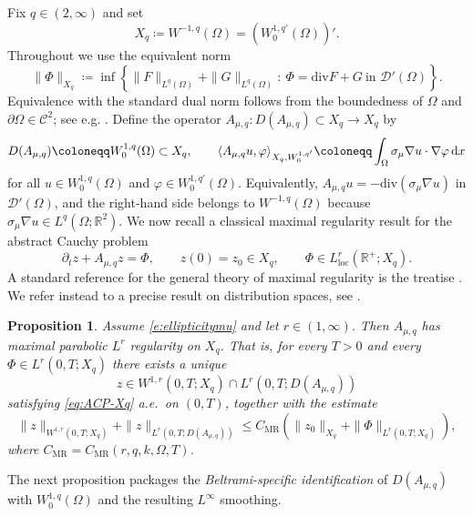 \documentclass[12pt,leqno]{amsart}
\def\d{{\rm d}}
\def\pt {{\partial_t}}
\newtheorem{proposition}[theorem]{Proposition}
\theoremstyle{definition}
\numberwithin{equation}{section}
\numberwithin{figure}{section}
\begin{document}
Fix $q\in(2,\infty)$ and set \[X_q\coloneqq W^{-1,q}(\Omega)=(W^{1,q'}_0(\Omega))'.\]
Throughout we use the equivalent norm
\begin{equation}\label{eq:Xq-norm}
\|\Phi\|_{X_q}\coloneqq
\inf\left\{\|F\|_{L^q(\Omega)}+\|G\|_{L^q(\Omega)}:\ \Phi={\mathrm{div}} F+G\ \text{in }\mathcal D'(\Omega)\right\}.
\end{equation}
Equivalence with the standard dual norm follows from the boundedness of $\Omega$ and
$\partial\Omega\in \mathcal C^2$; see e.g. \cite[Theorem~III.2.43]{Boyer-Fabrie-Book}.
Define the operator
$
A_{\mu,q}:D(A_{\mu,q})\subset X_q\to X_q
$
by
\begin{equation}\label{eq:def-Amuq}
D(A_{\mu,q})\coloneqq W^{1,q}_0(\Omega)\subset X_q,
\qquad
\langle A_{\mu,q}u,\varphi\rangle_{X_q,W^{1,q'}_0}
\coloneqq \int_\Omega \sigma_\mu \nabla u\cdot \nabla\varphi\,\d x
\end{equation}
for all $u\in W^{1,q}_0(\Omega)$ and $\varphi\in W^{1,q'}_0(\Omega)$.
Equivalently, $A_{\mu,q}u=-\mathrm{div}(\sigma_\mu\nabla u)$ in $\mathcal D'(\Omega)$, and the right-hand side
belongs to $W^{-1,q}(\Omega)$ because $\sigma_\mu\nabla u\in L^q(\Omega;\mathbb R^2)$.
We now recall a classical maximal regularity result for the abstract Cauchy problem
\begin{equation}\label{eq:ACP-Xq}
\pt z + A_{\mu,q}z = \Phi,\qquad z(0)=z_0\in X_q, \qquad \Phi\in L^r_{\mathrm{loc}}(\mathbb R^+;X_q).
\end{equation}
A standard reference for the general theory of maximal regularity is the treatise \cite{KunstmannWeis2004}. We refer instead to  a precise result on distribution spaces, see \cite{HR}.
\begin{proposition}\cite[Theorem 5.4]{HR}
\label{prop:MR-W-1q}
Assume \eqref{e:ellipticitymu} and let $r\in (1,\infty)$. Then $A_{\mu,q}$ has maximal parabolic $L^r$ regularity on $X_q$.
That is,  for every $T>0$ and every $\Phi\in L^r(0,T;X_q)$ there exists a unique
\[
z\in W^{1,r}(0,T;X_q)\cap L^r(0,T;D(A_{\mu,q}))
\]
satisfying \eqref{eq:ACP-Xq} a.e.\ on $(0,T)$, together with the estimate
\begin{equation}\label{eq:MR-est}
\|z\|_{W^{1,r}(0,T;X_q)}+\|z\|_{L^r(0,T;D(A_{\mu,q}))}
\le C_{\mathrm{MR}}\left(\|z_0\|_{X_q}+\|\Phi\|_{L^r(0,T;X_q)}\right),
\end{equation}where $C_{\mathrm{MR}}=C_{\mathrm{MR}}(r,q,k,\Omega,T)$.
\end{proposition}
 
The next proposition packages the \emph{Beltrami-specific identification} of $D(A_{\mu,q})$ with
$W^{1,q}_0(\Omega)$ and the resulting $L^\infty$ smoothing.  
\end{document}
